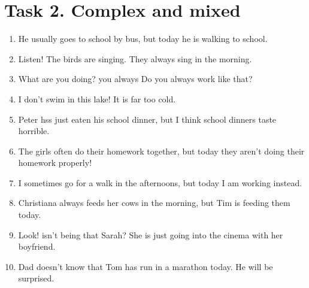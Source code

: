 \documentclass[a4paper,12pt]{report}
\begin{document}
\section*{Task 2. Complex and mixed}
\begin{enumerate}
    \item{He usually goes to school by bus, but today he is walking to school.}
    \item{Listen! The birds are singing. They always sing in the morning.} 
    \item{What are you doing? you always Do you always work like that?}
    \item{I don’t swim in this lake! It is far too cold.}
    \item{Peter hss just eaten his school dinner, but I think school dinners taste horrible.}
    \item{The girls often do their homework together, but today they aren’t doing their homework properly!}
    \item{I sometimes go for a walk in the afternoons, but today I am working instead.}
    \item{Christiana always feeds her cows in the morning, but Tim is feeding them today.}
    \item{Look! isn’t being that Sarah? She is just going into the cinema with her boyfriend.} 
    \item{Dad doesn’t know that Tom has run in a marathon today. He will be surprised.}
\end{enumerate}
\end{document}
